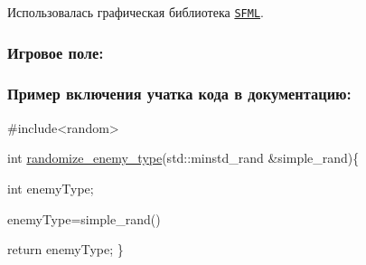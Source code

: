 Использовалась графическая библиотека \href{https://www.sfml-dev.org/}{\tt S\+F\+ML}. 

\subsubsection*{Игровое поле\+:}



\subsubsection*{Пример включения учатка кода в документацию\+:}


\begin{DoxyCode}
\textcolor{preprocessor}{#include<random>}

\textcolor{keywordtype}{int} \hyperlink{group__enemyHandler_ga21c57a411b6aa06a0f36c9eefab38b5b}{randomize\_enemy\_type}(std::minstd\_rand &simple\_rand)\{

    \textcolor{keywordtype}{int} enemyType;

    enemyType=simple\_rand()%

    \textcolor{keywordflow}{return} enemyType;
\}
\end{DoxyCode}
 